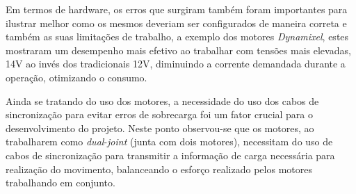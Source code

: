 Em termos de hardware, os erros que surgiram também foram importantes para ilustrar melhor como os mesmos deveriam ser configurados de maneira correta e também as suas limitações de trabalho, a exemplo dos motores \textit{Dynamixel}, estes mostraram um desempenho mais efetivo ao trabalhar com tensões mais elevadas, 14V ao invés dos tradicionais 12V, diminuindo a corrente demandada durante a operação, otimizando o consumo.      

Ainda se tratando do uso dos motores, a necessidade do uso dos cabos de sincronização para evitar erros de sobrecarga foi um fator crucial para o desenvolvimento do projeto. Neste ponto observou-se que os motores, ao trabalharem como \textit{dual}-\textit{joint} (junta com dois motores), necessitam do uso de cabos de sincronização para transmitir a informação de carga necessária para realização do movimento, balanceando o esforço realizado pelos motores trabalhando em conjunto.


